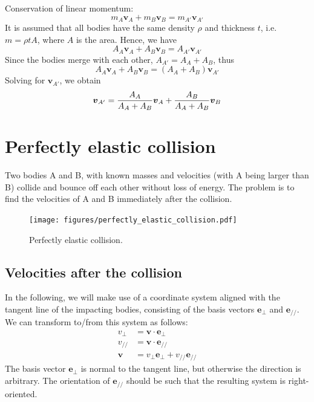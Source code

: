\documentclass{article}
\newcommand{\vbs}[0]{\boldsymbol{v}}
\newcommand{\ebs}[0]{\boldsymbol{e}}
\begin{document}
Conservation of linear momentum:
\begin{equation*}
m_A\vbs_A + m_B\vbs_B = m_{A'}\vbs_{A'}
\end{equation*}
It is assumed that all bodies have the same density $\rho$ and thickness $t$, i.e. $m = \rho t A$, where $A$ is the area. Hence, we have
\begin{equation*}
A_A\vbs_A + A_B\vbs_B = A_{A'}\vbs_{A'}
\end{equation*}
Since the bodies merge with each other, $A_{A'} = A_A + A_B$, thus
\begin{equation*}
A_A\vbs_A + A_B\vbs_B = (A_A + A_B)\vbs_{A'}
\end{equation*}
Solving for $\vbs_{A'}$, we obtain
\begin{equation}
\label{eq:perfectly_inelastic_{A'}ollision}
\vbs_{A'} = \frac{A_A}{A_A + A_B}\vbs_A + \frac{A_B}{A_A + A_B}\vbs_B
\end{equation}




\section{Perfectly elastic collision}
\label{sec:prefectly_elastic_collision}
Two bodies A and B, with known masses and velocities (with A being larger than B) collide and bounce off each other without loss of energy. The problem is to find the velocities of A and B immediately after the collision.

\begin{figure}[h]
	\centering
	{\texttt{[image: figures/perfectly\_elastic\_collision.pdf]}}
	\caption{Perfectly elastic collision.}\label{fig:perfectly_elastic_collision}
\end{figure}

\subsection{Velocities after the collision}
In the following, we will make use of a coordinate system aligned with the tangent line of the impacting bodies, consisting of the basis vectors $\ebs_{\perp}$ and $\ebs_{//}$. We can transform to/from this system as follows:
\begin{equation*}
\begin{split}
v_{\perp} &= \vbs\cdot\ebs_{\perp}\\
v_{//} &= \vbs\cdot\ebs_{//}\\
\vbs &= v_{\perp}\ebs_{\perp} + v_{//}\ebs_{//}
\end{split}
\end{equation*}
The basis vector $\ebs_{\perp}$ is normal to the tangent line, but otherwise the direction is arbitrary. The orientation of $\ebs_{//}$ should be such that the resulting system is right-oriented.
\end{document}
